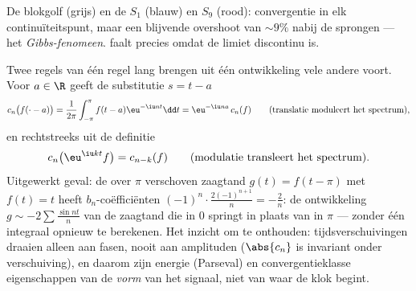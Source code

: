 \begin{omfigure}

{\small De blokgolf (grijs) en de  $S_1$
(blauw) en $S_9$ (rood): convergentie in elk continuïteitspunt,
maar een blijvende overshoot van $\sim 9\%$ nabij de sprongen ---
het \emph{Gibbs-fenomeen}.  faalt precies omdat de limiet discontinu is.}
\end{omfigure}

\begin{example}\label{ex:b2:fourier:shiftrules}
Twee regels van één regel lang brengen uit één ontwikkeling vele
andere voort. Voor $a \in \R$ geeft de substitutie $s = t - a$
\[
c_n\bigl(f(\cdot - a)\bigr)
= \frac{1}{2\pi}\int_{-\pi}^{\pi}f(t - a)\eu^{-\iu nt}\dd t
= \eu^{-\iu na}\,c_n(f)
\qquad\text{(translatie moduleert het spectrum)},
\]
en rechtstreeks uit de definitie
\[
c_n\bigl(\eu^{\iu kt}f\bigr) = c_{n-k}(f)
\qquad\text{(modulatie transleert het spectrum)}.
\]
Uitgewerkt geval: de over $\pi$ verschoven zaagtand $g(t) = f(t -
\pi)$ met $f(t) = t$ heeft $b_n$-coëfficiënten
$(-1)^n\cdot\frac{2(-1)^{n+1}}{n} = -\frac2n$: de ontwikkeling $g
\sim -2\sum\frac{\sin nt}{n}$ van de zaagtand die in $0$ springt
in plaats van in $\pi$ --- zonder één integraal opnieuw te
berekenen. Het inzicht om te onthouden: tijdsverschuivingen draaien
alleen aan fasen, nooit aan amplituden ($\abs{c_n}$ is invariant
onder verschuiving), en daarom zijn energie (Parseval) en
convergentieklasse eigenschappen van de \emph{vorm} van het
signaal, niet van waar de klok begint.
\end{example}

